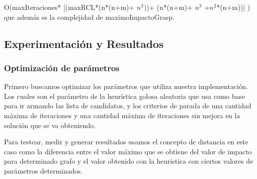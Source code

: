 O(maxIteraciones* [(maxRCL*(n*(n+m)+ $n^{3})$)+ (n*(n+m)+ $n^{3}$ +$ n^{2}$*(n+m))] )\\

 que además es la complejidad de maximoImpactoGrasp.\\


\subsection{Experimentación y Resultados}



\subsubsection{Optimización de parámetros}

\quad Primero buscamos optimizar los parámetros que utiliza nuestra implementación. Los cuales son el parámetro de la heurística golosa aleatoria que usa como base para ir armando las lista de candidatos, y los criterios de parada de una cantidad máxima de iteraciones y una cantidad máxima de iteraciones sin mejora en la solución que se va obteniendo.

\quad Para testear, medir y generar resultados usamos el concepto de distancia en este caso como la diferencia entre el valor máximo que se obtiene del valor de impacto para determinado grafo y el valor obtenido con la heuristica con ciertos valores de parámetros determinados.

